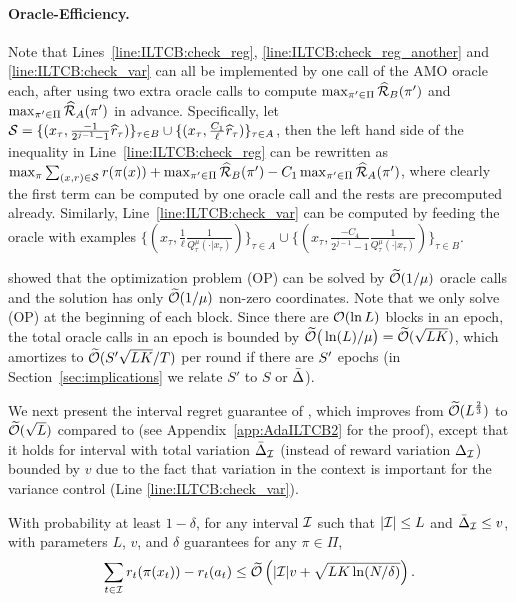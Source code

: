 \paragraph{Oracle-Efficiency.}
Note that Lines~\ref*{line:ILTCB:check_reg}, \ref*{line:ILTCB:check_reg_another} and \ref*{line:ILTCB:check_var}
can all be implemented by one call of
the AMO oracle each, after using two extra oracle calls to compute $\max_{\pi' \in \Pi}\widehat{\cal{R}}_{B}(\pi')$ and $\max_{\pi' \in \Pi}\widehat{\cal{R}}_{A}(\pi')$ in advance. %
Specifically, let ${\mathcal{S}} = \{(x_\tau,
\frac{-1}{2^{j-1}-1}\widehat{r}_\tau)\}_{\tau\in B} \cup \{(x_\tau,
\frac{C_1}{\ell} \widehat{r}_\tau)\}_{\tau\in A}$, then the left hand
side of the inequality in Line~\ref*{line:ILTCB:check_reg} can be rewritten
as $\max_\pi \sum_{(x,r) \in {\mathcal{S}}} r(\pi(x)) + \max_{\pi' \in
  \Pi}\widehat{\cal{R}}_{B}(\pi') - C_1\max_{\pi' \in
  \Pi}\widehat{\cal{R}}_{A}(\pi')$, where clearly the first term can be
computed by one oracle call and the rests are precomputed already.
Similarly, Line~\ref*{line:ILTCB:check_var} can be computed by feeding
the oracle with examples $ \{(x_\tau,
\frac{1}{\ell}\frac{1}{Q_\tau^{\mu}(\cdot| x_\tau)})\}_{\tau\in A} \cup
\{(x_\tau, \frac{-C_4}{2^{j-1}-1} \frac{1}{Q_\tau^{\mu}(\cdot |
  x_\tau)})\}_{\tau\in B}$. 
  
\citet{AgarwalHsKaLaLiSc14} showed that the optimization problem (OP) can be
solved by $\widetilde{\mathcal{O}}(1/\mu)$ oracle calls and the solution
has only $\widetilde{\mathcal{O}}(1/\mu)$ non-zero coordinates. Note that we only solve (OP) at the beginning of each block. Since there are $\mathcal{O}(\ln L)$ blocks in an epoch, the total oracle calls in an epoch is bounded by $\widetilde{\mathcal{O}}\big(\ln(L)/\mu \big) = \widetilde{\mathcal{O}}(\sqrt{LK})$, which amortizes to $\widetilde{\mathcal{O}}(S^\prime\sqrt{LK}/T)$ per round if there are $S^\prime$ epochs
(in Section~\ref{sec:implications} we relate $S'$ to $S$ or $\bar{\Delta}$). 

We next present the interval regret guarantee of \AdaILTCB,
which improves from $\widetilde{\mathcal{O}}(L^\frac{2}{3})$ to $\widetilde{\mathcal{O}}(\sqrt{L})$ compared to \AdaEG
(see Appendix~\ref{app:AdaILTCB2} for the proof),
except that it holds for interval with total variation $\bar{\Delta}_{\mathcal{I}}$ (instead of reward variation $\Delta_{\mathcal{I}}$) bounded by $v$
due to the fact that variation in the context is important for the variance control (Line \ref*{line:ILTCB:check_var}).

\begin{theorem}\label{thm:AdaILTCB2}
With probability at least $1 - \delta$, for any interval ${\mathcal{I}}$ such
that $|{\mathcal{I}}| \leq L$ and $\bar{\Delta}_{\mathcal{I}}\leq v$, 
\AdaILTCB with parameters $L$, $v$, and $\delta$
guarantees for any $\pi \in \Pi$,
\[
\sum_{t \in {\mathcal{I}}} r_t(\pi(x_t)) - r_t(a_t) \leq
\widetilde{\mathcal{O}}\left(\lvert{\mathcal{I}}\rvert v + \sqrt{LK\ln(N/\delta)}\right). 
\]
\end{theorem}

